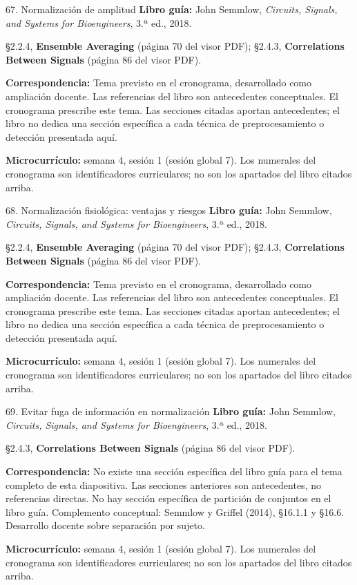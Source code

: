 \documentclass[
  10pt,
  ignorenonframetext,
  aspectratio=169,
  spanish,
]{beamer}
\begin{document}
\begin{frame}{67. Normalización de amplitud}
\label{normalizaciuxf3n-de-amplitud}
\textbf{Libro guía:} John Semmlow, \emph{Circuits, Signals, and Systems
for Bioengineers}, 3.ª ed., 2018.

§2.2.4, \textbf{Ensemble Averaging} (página 70 del visor PDF); §2.4.3,
\textbf{Correlations Between Signals} (página 86 del visor PDF).

\textbf{Correspondencia:} Tema previsto en el cronograma, desarrollado
como ampliación docente. Las referencias del libro son antecedentes
conceptuales. El cronograma prescribe este tema. Las secciones citadas
aportan antecedentes; el libro no dedica una sección específica a cada
técnica de preprocesamiento o detección presentada aquí.

\textbf{Microcurrículo:} semana 4, sesión 1 (sesión global 7). Los
numerales del cronograma son identificadores curriculares; no son los
apartados del libro citados arriba.
\end{frame}

\begin{frame}{68. Normalización fisiológica: ventajas y riesgos}
\label{normalizaciuxf3n-fisioluxf3gica-ventajas-y-riesgos}
\textbf{Libro guía:} John Semmlow, \emph{Circuits, Signals, and Systems
for Bioengineers}, 3.ª ed., 2018.

§2.2.4, \textbf{Ensemble Averaging} (página 70 del visor PDF); §2.4.3,
\textbf{Correlations Between Signals} (página 86 del visor PDF).

\textbf{Correspondencia:} Tema previsto en el cronograma, desarrollado
como ampliación docente. Las referencias del libro son antecedentes
conceptuales. El cronograma prescribe este tema. Las secciones citadas
aportan antecedentes; el libro no dedica una sección específica a cada
técnica de preprocesamiento o detección presentada aquí.

\textbf{Microcurrículo:} semana 4, sesión 1 (sesión global 7). Los
numerales del cronograma son identificadores curriculares; no son los
apartados del libro citados arriba.
\end{frame}

\begin{frame}{69. Evitar fuga de información en normalización}
\label{evitar-fuga-de-informaciuxf3n-en-normalizaciuxf3n}
\textbf{Libro guía:} John Semmlow, \emph{Circuits, Signals, and Systems
for Bioengineers}, 3.ª ed., 2018.

§2.4.3, \textbf{Correlations Between Signals} (página 86 del visor PDF).

\textbf{Correspondencia:} No existe una sección específica del libro
guía para el tema completo de esta diapositiva. Las secciones anteriores
son antecedentes, no referencias directas. No hay sección específica de
partición de conjuntos en el libro guía. Complemento conceptual: Semmlow
y Griffel (2014), §16.1.1 y §16.6. Desarrollo docente sobre separación
por sujeto.

\textbf{Microcurrículo:} semana 4, sesión 1 (sesión global 7). Los
numerales del cronograma son identificadores curriculares; no son los
apartados del libro citados arriba.
\end{frame}
\end{document}
